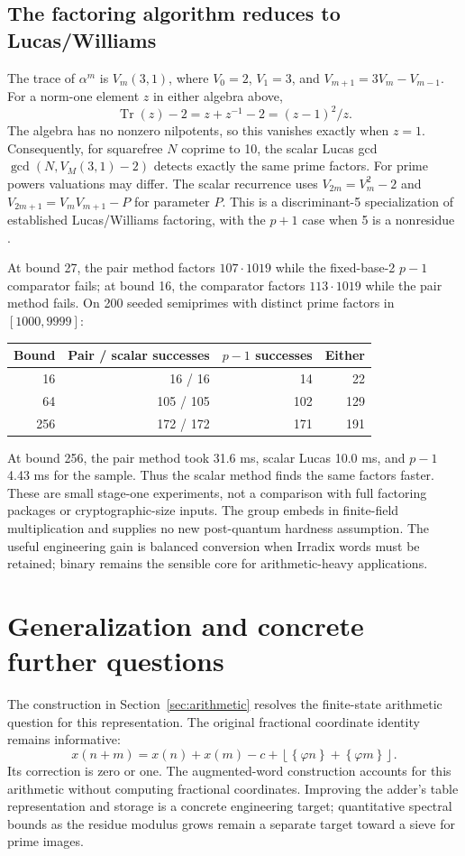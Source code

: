 \documentclass[11pt]{article}
\theoremstyle{definition}\newtheorem{definition}[theorem]{Definition}
\newcommand{\ph}{\varphi}
\newcommand{\fl}[1]{\left\lfloor #1\right\rfloor}
\newcommand{\fr}[1]{\left\{#1\right\}}
\begin{document}
\subsection{The factoring algorithm reduces to Lucas/Williams}
The trace of $\alpha^m$ is $V_m(3,1)$, where
$V_0=2$, $V_1=3$, and $V_{m+1}=3V_m-V_{m-1}$.
For a norm-one element $z$ in either algebra above,
\[
 \operatorname{Tr}(z)-2=z+z^{-1}-2=(z-1)^2/z.
\]
The algebra has no nonzero nilpotents, so this vanishes exactly when
$z=1$. Consequently, for squarefree $N$ coprime to 10, the scalar
Lucas gcd $\gcd(N,V_M(3,1)-2)$ detects exactly the same prime factors.
For prime powers valuations may differ. The scalar recurrence uses
$V_{2m}=V_m^2-2$ and $V_{2m+1}=V_mV_{m+1}-P$ for parameter $P$.
This is a discriminant-5 specialization of established Lucas/Williams
factoring, with the $p+1$ case when 5 is a nonresidue
\cite{williams,gmpecm}.

At bound 27, the pair method factors $107\cdot1019$ while the fixed-base-2
$p-1$ comparator fails; at bound 16, the comparator factors
$113\cdot1019$ while the pair method fails. On 200 seeded semiprimes
with distinct prime factors in $[1000,9999]$:
\begin{center}
\begin{tabular}{rrrr}
\toprule
Bound & Pair / scalar successes & $p-1$ successes & Either\\
\midrule
16 & 16 / 16 & 14 & 22\\
64 & 105 / 105 & 102 & 129\\
256 & 172 / 172 & 171 & 191\\
\bottomrule
\end{tabular}
\end{center}
At bound 256, the pair method took 31.6 ms, scalar Lucas 10.0 ms, and
$p-1$ 4.43 ms for the sample. Thus the scalar method finds the same
factors faster. These are small stage-one experiments, not a comparison
with full factoring packages or cryptographic-size inputs. The group
embeds in finite-field multiplication and supplies no new post-quantum
hardness assumption. The useful engineering gain is balanced conversion
when Irradix words must be retained; binary remains the sensible core
for arithmetic-heavy applications.

\clearpage
\section{Generalization and concrete further questions}
The construction in Section~\ref{sec:arithmetic} resolves the finite-state
arithmetic question for this representation. The original fractional
coordinate identity remains informative:
\[
x(n+m)=x(n)+x(m)-c+\fl{\fr{\ph n}+\fr{\ph m}}.
\]
Its correction is zero or one. The augmented-word construction accounts
for this arithmetic without computing fractional coordinates. Improving
the adder's table representation and storage is a concrete engineering
target; quantitative spectral bounds as the residue modulus grows remain
a separate target toward a sieve for prime images.
\end{document}
